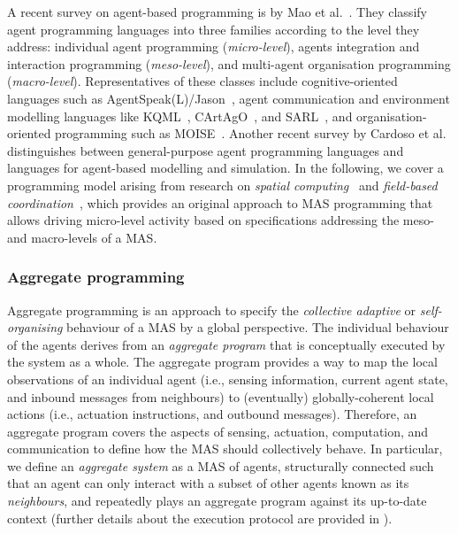 A recent survey on agent-based programming 
 is by Mao et al.~\cite{DBLP:journals/wias/MaoWY17}.
%
They classify agent programming languages 
 into three families according to the level they address:
 individual agent programming (\emph{micro-level}),
 agents integration and interaction programming (\emph{meso-level}),
 and 
 multi-agent organisation programming (\emph{macro-level}).
%
Representatives 
 of these classes
 include cognitive-oriented languages
 such as AgentSpeak(L)/Jason~\cite{bordini2007programming-mas-agentspeak},
 agent communication and environment modelling languages
 like KQML~\cite{DBLP:conf/cikm/FininFMM94}, CArtAgO~\cite{DBLP:books/sp/09/RicciPVO09}, and SARL~\cite{DBLP:conf/webi/RodriguezGG14},
 and organisation-oriented programming such as MOISE~\cite{DBLP:journals/ijaose/HubnerSB07}.
%
Another recent survey by Cardoso et al.~\cite{computers10020016}
 distinguishes between general-purpose agent programming languages
  and languages for agent-based modelling and simulation.
%
In the following, we cover a programming model
 arising from research on \emph{spatial computing}~\cite{dagstuhl2006seminar-space-oriented-computation,DBLP:journals/corr/abs-1202-5509}
 and \emph{field-based coordination}~\cite{DBLP:books/daglib/0015276,viroli2019jlamp-si-coord},
 which provides an original approach
 to MAS programming
 that allows driving micro-level activity
 based on specifications
 addressing the meso- and macro-levels of a MAS.

\subsubsection{Aggregate programming}
\label{background-ac}

Aggregate programming is an approach 
 to specify the \emph{collective adaptive}
 or \emph{self-organising} behaviour
 of a MAS by a global perspective.
%
The individual behaviour of the agents
 derives from an \emph{aggregate program}
 that is conceptually executed by the system as a whole.
%
The aggregate program 
 provides a way to map 
 the local observations of an individual agent
 (i.e., sensing information, current agent state, and inbound messages from neighbours)
 to (eventually) globally-coherent local actions
 (i.e., actuation instructions, and outbound messages).
%
Therefore, an aggregate program 
 covers the aspects of 
 sensing, actuation, computation, and communication
 to define how the MAS should collectively behave.
%
In particular, we define an \emph{aggregate system}
 as a MAS of agents,
 structurally connected such that an agent can only interact with a subset of other agents known as its \emph{neighbours},
 and repeatedly plays an aggregate program against its up-to-date context
 (further details about the execution protocol are provided in ).

